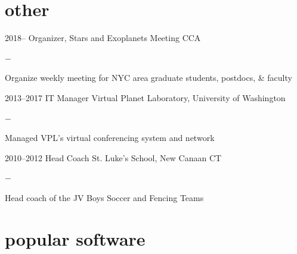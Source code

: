 \documentclass[]{luger-cv} %
\begin{document}
    \section{other}
    \begin{entrylist}


        \entry
        {2018--}
        {Organizer, Stars and Exoplanets Meeting}
        {CCA}
        {%
            \vspace{-1em}
            \begin{list}{{\color{numcolor}$-$}}{\cvlist}
                \item Organize weekly meeting for NYC area graduate students, postdocs, \& faculty
            \end{list}
        }


        \entry
        {2013--2017}
        {IT Manager}
        {Virtual Planet Laboratory, University of Washington}
        {%
            \vspace{-1em}
            \begin{list}{{\color{numcolor}$-$}}{\cvlist}
                \item Managed VPL's virtual conferencing system and network
            \end{list}
        }


        \entry
        {2010--2012}
        {Head Coach}
        {St. Luke's School, New Canaan CT}
        {%
            \vspace{-1em}
            \begin{list}{{\color{numcolor}$-$}}{\cvlist}
                \item Head coach of the JV Boys Soccer and Fencing Teams
            \end{list}
        }


    \end{entrylist}

    \section{popular software}
\end{document}
